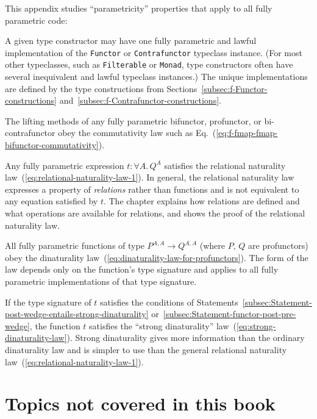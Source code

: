 This appendix studies \textsf{``}parametricity\textsf{''} properties that apply to
all fully parametric code:

A given type constructor may have one fully parametric and lawful
implementation of the \lstinline!Functor! or \lstinline!Contrafunctor!
typeclass instance. (For most other typeclasses, such as \lstinline!Filterable!
or \lstinline!Monad!, type constructors often have several inequivalent
and lawful typeclass instances.) The unique implementations are defined
by the type constructions from Sections~\ref{subsec:f-Functor-constructions}
and~\ref{subsec:f-Contrafunctor-constructions}.

The lifting methods of any fully parametric bifunctor, profunctor,
or bi-contrafunctor obey the commutativity law such as Eq.~(\ref{eq:f-fmap-fmap-bifunctor-commutativity}). 

Any fully parametric expression $t:\forall A.\,Q^{A}$ satisfies the
relational naturality law~(\ref{eq:relational-naturality-law-1}).
In general, the relational naturality law expresses a property of
\emph{relations} rather than functions and is not equivalent to any
equation satisfied by $t$. The chapter explains how relations are
defined and what operations are available for relations, and shows
the proof of the relational naturality law.

All fully parametric functions of type $P^{A,A}\rightarrow Q^{A,A}$
(where $P$, $Q$ are profunctors) obey the dinaturality law~(\ref{eq:dinaturality-law-for-profunctors}).
The form of the law depends only on the function\textsf{'}s type signature
and applies to all fully parametric implementations of that type signature.

If the type signature of $t$ satisfies the conditions of Statements~\ref{subsec:Statement-post-wedge-entails-strong-dinaturality}
or~\ref{subsec:Statement-functor-post-pre-wedge}, the function $t$
satisfies the \textsf{``}strong dinaturality\textsf{''} law~(\ref{eq:strong-dinaturality-law}).
Strong dinaturality gives more information than the ordinary dinaturality
law and is simpler to use than the general relational naturality law~(\ref{eq:relational-naturality-law-1}).

\setcounter{secnumdepth}{3}%
\begin{comment}
Restore the normal numbering of subsections and subsubsections
\end{comment}


\section{Topics not covered in this book}

